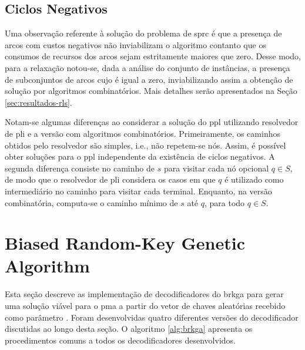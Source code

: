 \subsection{Ciclos Negativos} \label{subsec:rl-ciclo-negativo}

Uma observação referente à solução do problema de \gls{sprc} é que a presença de
arcos com custos negativos não inviabilizam o algoritmo contanto que os consumos
de recursos  dos arcos sejam estritamente  maiores que zero. Desse  modo, para a
relaxação {\rlq} notou-se, dada a análise  do conjunto de instâncias, a presença
de subconjuntos de  arcos cujo {\jitter} é igual a  zero, inviabilizando assim a
obtenção  de   solução  por   algoritmos  combinatórios.  Mais   detalhes  serão
apresentados na Seção \ref{sec:resultados-rls}.

Notam-se  algumas diferenças  ao considerar  a solução  do \gls{ppl}  utilizando
resolvedor de \gls{pli} e a  versão com algoritmos combinatórios. Primeiramente,
os  caminhos obtidos  pelo resolvedor  são  simples, i.e.,  não repetem-se  nós.
Assim, é possível obter soluções para  o \gls{ppl} independente da existência de
ciclos negativos.  A segunda diferença consiste  no caminho de $s$  para visitar
cada nó opcional $q  \in S$, de modo que o resolvedor  de \gls{pli} considera os
casos em  que $q$ é  utilizado como intermediário  no caminho para  visitar cada
terminal. Enquanto, na  versão combinatória, computa-se o caminho  mínimo de $s$
até $q$, para todo $q \in S$.

\section{Biased Random-Key Genetic Algorithm} \label{sec:brkga}


Esta  seção descreve  as implementação  de decodificadores  do \gls{brkga}  para
gerar uma solução viável para o \gls{pma} a partir do vetor de chaves aleatórias
recebido como parâmetro \cite{toso:2015}.  Foram desenvolvidas quatro diferentes
versões  do  decodificador   discutidas  ao  longo  desta   seção.  O  algoritmo
\ref{alg:brkga}  apresenta os  procedimentos comuns  a todos  os decodificadores
desenvolvidos.


